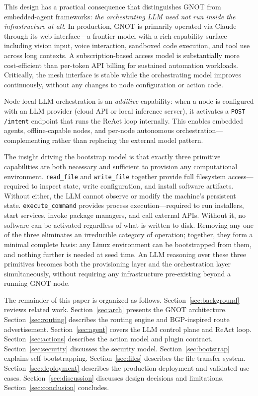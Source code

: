 \documentclass[10pt,twocolumn]{article}
\begin{document}
This design has a practical consequence that distinguishes GNOT from
embedded-agent frameworks: \emph{the orchestrating LLM need not run
inside the infrastructure at all}. In production, GNOT is primarily
operated via Claude through its web interface---a frontier model with
a rich capability surface including vision input, voice interaction,
sandboxed code execution, and tool use across long contexts. A
subscription-based access model is substantially more cost-efficient
than per-token API billing for sustained automation workloads.
Critically, the mesh interface is stable while the orchestrating model
improves continuously, without any changes to node configuration or
action code.

Node-local LLM orchestration is an \emph{additive} capability: when a
node is configured with an LLM provider (cloud API or local inference
server), it activates a \texttt{POST /intent} endpoint that runs the
ReAct loop internally. This enables embedded agents, offline-capable
nodes, and per-node autonomous orchestration---complementing rather
than replacing the external model pattern.

The insight driving the bootstrap model is that exactly three primitive
capabilities are both necessary and sufficient to provision any
computational environment. \texttt{read\_file} and \texttt{write\_file}
together provide full filesystem access---required to inspect state,
write configuration, and install software artifacts. Without either,
the LLM cannot observe or modify the machine's persistent state.
\texttt{execute\_command} provides process execution---required to run
installers, start services, invoke package managers, and call external
APIs. Without it, no software can be activated regardless of what is
written to disk. Removing any one of the three eliminates an
irreducible category of operation; together, they form a minimal
complete basis: any Linux environment can be bootstrapped from them,
and nothing further is needed at seed time. An LLM reasoning over
these three primitives becomes both the provisioning layer and the
orchestration layer simultaneously, without requiring any
infrastructure pre-existing beyond a running GNOT node.

The remainder of this paper is organized as follows.
Section~\ref{sec:background} reviews related work.
Section~\ref{sec:arch} presents the GNOT architecture.
Section~\ref{sec:routing} describes the routing engine and BGP-inspired
route advertisement. Section~\ref{sec:agent} covers the LLM control
plane and ReAct loop. Section~\ref{sec:actions} describes the action
model and plugin contract. Section~\ref{sec:security} discusses the
security model. Section~\ref{sec:bootstrap} explains self-bootstrapping.
Section~\ref{sec:files} describes the file transfer system.
Section~\ref{sec:deployment} describes the production deployment and
validated use cases. Section~\ref{sec:discussion} discusses design
decisions and limitations. Section~\ref{sec:conclusion} concludes.
\end{document}

